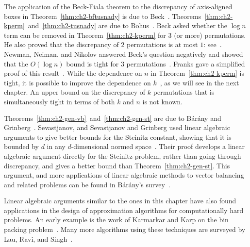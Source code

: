 The application of the Beck-Fiala theorem to the discrepancy of
axis-aligned boxes in Theorem~\ref{thm:ch2-bftusnady} is due
to Beck~\cite{beck-rect}. Theorems~\ref{thm:ch2-kperm}~and~\ref{thm:ch2-tusnady} are due to
Bohus~\cite{Bohus}. Beck asked whether the $\log n$ term can be
removed in Theorem~\ref{thm:ch2-kperm} for $3$ (or more)
permutations. He also proved that the discrepancy of $2$ permutations
is at most $1$: see~\cite{spencer-lectures}. Newman, Neiman, and Nikolov
answered Beck's question negatively and showed that the $O(\log n)$ bound is
tight for $3$ permutations~\cite{beck3perm}. Franks gave a simplified proof of this
result~\cite{Franks21}.  While the dependence on $n$ in
Theorem~\ref{thm:ch2-kperm} is tight, it is possible to improve the
dependence on $k$~\cite{SST-perms}, as we will see in the next
chapter. An upper bound on the discrepancy of $k$ permutations that is
simultaneously tight in terms of both $k$ and $n$ is not known.

Theorems~\ref{thm:ch2-gen-vb}~and~\ref{thm:ch2-gen-st}
are due to B\'ar\'any and Grinberg~\cite{baranygrinberg}. 
Sevastjanov, and Sevastjanov and Grinberg used linear algebraic
arguments to give better bounds for the Steinitz constant, showing
that it is bounded by $d$ in any $d$-dimensional normed
space~\cite{Sev78,GS80}. Their proof develops a linear algebraic
argument directly for the Steinitz problem, rather than going through
discrepancy, and gives a better bound than
Theorem~\ref{thm:ch2-gen-st}. This argument, and more applications of
linear algebraic methods to vector balancing and related problems can
be found in B\'ar\'any's survey~\cite{B08}. 

Linear algebraic arguments similar to the ones in this chapter have
also found applications in the design of approximation algorithms for
computationally hard problems. An early example is the work of
Karmarkar and Karp on the bin packing
problem~\cite{KarmarkarK82}. Many more algorithms using these
techniques are surveyed by Lau, Ravi, and
Singh~\cite{iterative-book}. 


